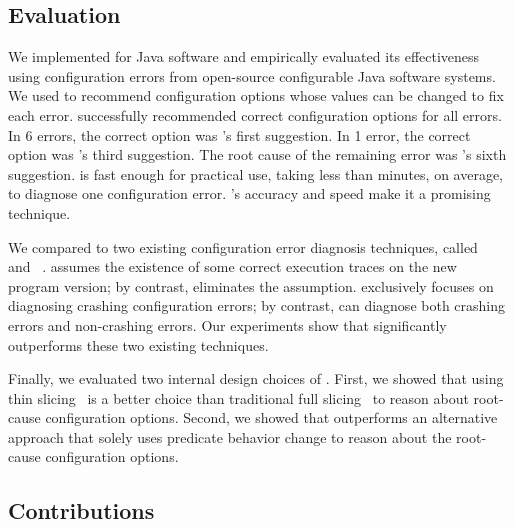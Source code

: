 \subsection{Evaluation}

We implemented \ourtool for Java software and empirically evaluated
its effectiveness using \errornum configuration errors
from \subjnum open-source configurable Java software systems. 
We used \ourtool to recommend configuration options whose values
can be changed to fix each error.
\ourtool successfully recommended correct configuration options
for all \errornum errors. In 6 errors, the correct option was \ourtool's first
suggestion. In 1 error, the correct option was
\ourtool's third suggestion. The root cause of the remaining
error was \ourtool's sixth suggestion. \ourtool is fast enough for practical use,
taking less than \avgtime minutes,
on average, to diagnose one configuration error.
\ourtool's accuracy and speed make it a promising technique.


We compared \ourtool to two existing configuration error diagnosis
techniques, called \prevtool~\cite{Zhang:2013:ADS}
and \conftool~\cite{Rabkin:2011:PPC}.
\prevtool assumes the existence of some correct execution traces
on the new program version; by contrast, \ourtool eliminates the
assumption.
\conftool exclusively focuses on diagnosing crashing configuration errors;
by contrast, \ourtool can diagnose both crashing errors and
non-crashing errors.
Our experiments
show that \ourtool significantly outperforms these two existing techniques.

Finally, we evaluated two internal design choices of \ourtool. First, we 
showed that using thin slicing~\cite{Sridharan:2007} is a better choice than
traditional full slicing~\cite{Horwitz:1988} to reason about 
root-cause configuration options. Second, we showed that 
\ourtool outperforms an alternative approach
that solely uses predicate behavior change to reason about
the root-cause configuration options.




\subsection{Contributions}

